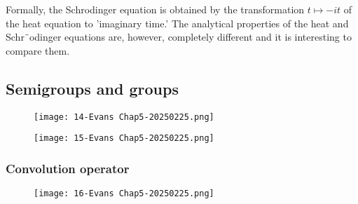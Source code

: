 \begin{note}
Formally, the Schrodinger equation is obtained by the transformation $\displaystyle t\mapsto-it$ of the heat equation to 'imaginary time.' The analytical properties of the heat and Schr¨odinger equations are, however, completely different and it is interesting to compare them.
\end{note}
\subsection{Semigroups and groups}

\begin{figure}[H]
\centering
\texttt{[image: 14-Evans Chap5-20250225.png]}
\label{}
\end{figure}
\begin{figure}[H]
\centering
\texttt{[image: 15-Evans Chap5-20250225.png]}
\label{}
\end{figure}

\subsubsection{Convolution operator}

\begin{figure}[H]
\centering
\texttt{[image: 16-Evans Chap5-20250225.png]}
\label{}
\end{figure}
